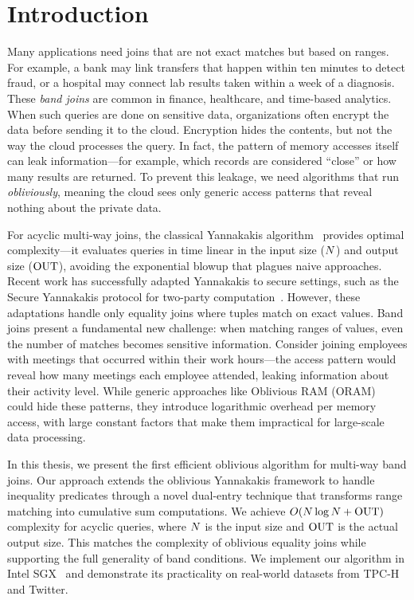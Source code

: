 \chapter{Introduction}

Many applications need joins that are not exact matches but based on ranges. For example, a bank may link transfers that happen within ten minutes to detect fraud, or a hospital may connect lab results taken within a week of a diagnosis. These \emph{band joins} are common in finance, healthcare, and time-based analytics. When such queries are done on sensitive data, organizations often encrypt the data before sending it to the cloud. Encryption hides the contents, but not the way the cloud processes the query. In fact, the pattern of memory accesses itself can leak information---for example, which records are considered ``close'' or how many results are returned. To prevent this leakage, we need algorithms that run \emph{obliviously}, meaning the cloud sees only generic access patterns that reveal nothing about the private data.

For acyclic multi-way joins, the classical Yannakakis algorithm~\cite{yannakakis1981} provides optimal complexity---it evaluates queries in time linear in the input size ($N$) and output size ($\text{OUT}$), avoiding the exponential blowup that plagues naive approaches. Recent work has successfully adapted Yannakakis to secure settings, such as the Secure Yannakakis protocol for two-party computation~\cite{wang2021secure}. However, these adaptations handle only equality joins where tuples match on exact values. Band joins present a fundamental new challenge: when matching ranges of values, even the number of matches becomes sensitive information. Consider joining employees with meetings that occurred within their work hours---the access pattern would reveal how many meetings each employee attended, leaking information about their activity level. While generic approaches like Oblivious RAM (ORAM)~\cite{goldreich1996} could hide these patterns, they introduce logarithmic overhead per memory access, with large constant factors that make them impractical for large-scale data processing.

In this thesis, we present the first efficient oblivious algorithm for multi-way band joins. Our approach extends the oblivious Yannakakis framework to handle inequality predicates through a novel dual-entry technique that transforms range matching into cumulative sum computations. We achieve $O(N \log N + \text{OUT})$ complexity for acyclic queries, where $N$ is the input size and $\text{OUT}$ is the actual output size. This matches the complexity of oblivious equality joins while supporting the full generality of band conditions. We implement our algorithm in Intel SGX~\cite{sgx2016} and demonstrate its practicality on real-world datasets from TPC-H and Twitter.

